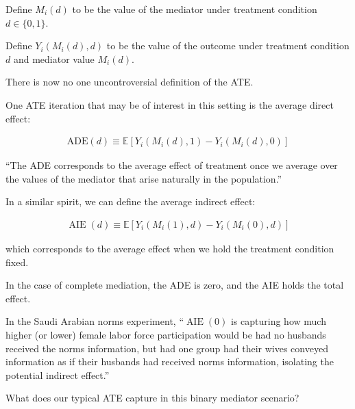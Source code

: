 \documentclass[10pt]{article}
\begin{document}
Define $M_i(d)$ to be the value of the mediator under 
treatment condition $d \in \{0, 1\}$.

Define $Y_i\left(M_i(d), d\right)$ to be the value of the outcome
under treatment condition $d$ and mediator value $M_i(d)$.

There is now no one uncontroversial 
definition of the ATE.

\begin{definition} 
    One ATE iteration that may be of interest in this setting is the
    average direct effect:

    \begin{align}
        \text{ADE}(d) \equiv \mathbb{E}\left[Y_i\left(M_i(d), 1\right)-Y_i\left(M_i(d), 0\right)\right]
    \end{align}

    ``The ADE corresponds to the average effect of treatment once we 
    average over the values of the mediator that arise naturally 
    in the population.''

\end{definition}

\begin{definition} 
    
    In a similar spirit, we can define the average indirect effect:

    \begin{align}
        \operatorname{AIE}(d) \equiv \mathbb{E}\left[Y_i\left(M_i(1), d\right)-Y_i\left(M_i(0), d\right)\right]
    \end{align}

    which corresponds to the average effect when we hold 
    the treatment condition fixed. 

\end{definition}

In the case of complete mediation, the ADE is zero,
and the AIE holds the total effect.

\begin{example}
    In the Saudi Arabian norms experiment,
   ``$\operatorname{AIE}(0)$ is capturing how much 
    higher (or lower) female labor force participation 
    would be had no husbands received the norms information,
    but had one group had their wives conveyed information 
    as if their husbands had received norms information,
    isolating the potential indirect effect.''
\end{example}

What does our typical ATE capture in this binary mediator scenario?
\end{document}
